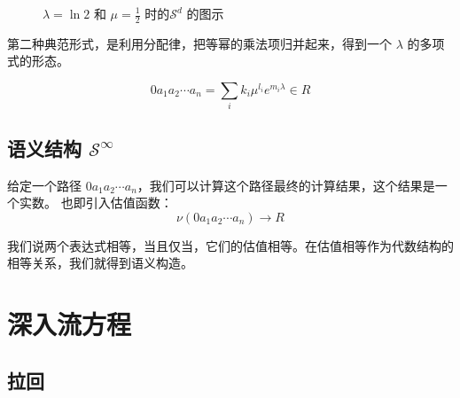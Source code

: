 \documentclass[a4paper,12pt]{article}
\numberwithin{definition}{section}
\numberwithin{lemma}{section}
\numberwithin{proposition}{section}
\numberwithin{theorem}{section}
\numberwithin{grammar}{section}
\numberwithin{program}{section}
\numberwithin{convention}{section}
\numberwithin{corollary}{section}
\begin{document}
\begin{figure}[ht]
{
}
\caption{ $\lambda=\ln2$ 和 $\mu=\frac{1}{2}$ 时的$\mathcal{S}^d$ 的图示}\label{fig:grid0}
\end{figure}

第二种典范形式，是利用分配律，把等幂的乘法项归并起来，得到一个 $\lambda$ 的多项式的形态。

$$
0 a_1 a_2 \cdots a_n = \sum_{i} k_i \mu^{l_i} e^{m_i \lambda} \in R
$$

\subsection{语义结构 $\mathcal{S}^\infty$}\label{subsec:semantical}

给定一个路径 $ 0 a_1 a_2 \cdots a_n $，我们可以计算这个路径最终的计算结果，这个结果是一个实数。
也即引入估值函数：
$$
\nu(0 a_1 a_2 \cdots a_n) \to R
$$

我们说两个表达式相等，当且仅当，它们的估值相等。在估值相等作为代数结构的相等关系，我们就得到语义构造。

\newpage

\section{深入流方程}

\subsection{拉回}
\end{document}

